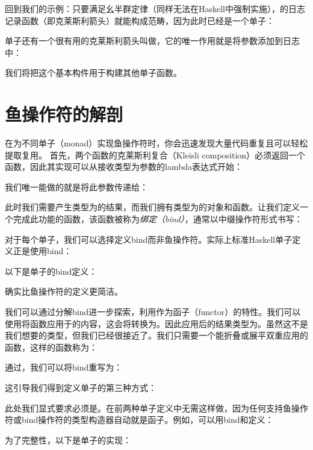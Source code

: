 回到我们的示例：只要满足幺半群定律（同样无法在Haskell中强制实施），的日志记录函数（即克莱斯利箭头）就能构成范畴，因为此时已经是一个单子：


单子还有一个很有用的克莱斯利箭头叫做，它的唯一作用就是将参数添加到日志中：

我们将把这个基本构件用于构建其他单子函数。

\section{鱼操作符的解剖}

在为不同单子（monad）实现鱼操作符时，你会迅速发现大量代码重复且可以轻松提取复用。
首先，两个函数的克莱斯利复合（Kleisli composition）必须返回一个函数，因此其实现可以从接收类型为参数的lambda表达式开始：

我们唯一能做的就是将此参数传递给：

此时我们需要产生类型为的结果，而我们拥有类型为的对象和函数。让我们定义一个完成此功能的函数，该函数被称为\emph{绑定（bind）}，通常以中缀操作符形式书写：

对于每个单子，我们可以选择定义bind而非鱼操作符。实际上标准Haskell单子定义正是使用bind：

以下是单子的bind定义：

确实比鱼操作符的定义更简洁。

我们可以通过分解bind进一步探索，利用作为函子（functor）的特性。我们可以使用将函数应用于的内容，这会将转换为。因此应用后的结果类型为。虽然这不是我们想要的类型，但我们已经很接近了。我们只需要一个能折叠或展平双重应用的函数，这样的函数称为：

通过，我们可以将bind重写为：

这引导我们得到定义单子的第三种方式：

此处我们显式要求必须是。在前两种单子定义中无需这样做，因为任何支持鱼操作符或bind操作符的类型构造器自动就是函子。例如，可以用bind和定义：

为了完整性，以下是单子的实现：

